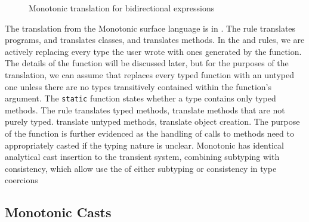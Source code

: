 \documentclass[a4paper,USenglish]{tex/lipics-v2016}
\begin{document}
\begin{figure}[!ht]
\begin{mathpar}
\end{mathpar}

\begin{mathpar}

\end{mathpar}

\caption{Monotonic translation for bidirectional expressions}
\label{mono}
\end{figure}

The translation from the Monotonic surface language is in . The
rule  translates programs,  and 
translates classes, and  translates methods. In the 
and  rules, we are actively replacing every type the user wrote
with ones generated by the  function. The details of the
 function will be discussed later, but for the purposes of the
translation, we can assume that  replaces every typed function
with an untyped one unless there are no \any types transitively contained
within the function's argument.  The \texttt{static} function states whether
a type contains only typed methods.  The rule  translates
typed methods,  translate methods that are not purely typed.
 translate untyped methods,  translate object
creation.  The purpose of the  function is further evidenced as
the handling of calls to methods need to appropriately casted if the typing
nature is unclear.  Monotonic has identical analytical cast insertion to the
transient system, combining subtyping with consistency, which allow use the
of either subtyping or consistency in type coercions

\subsection{Monotonic Casts}
\end{document}
